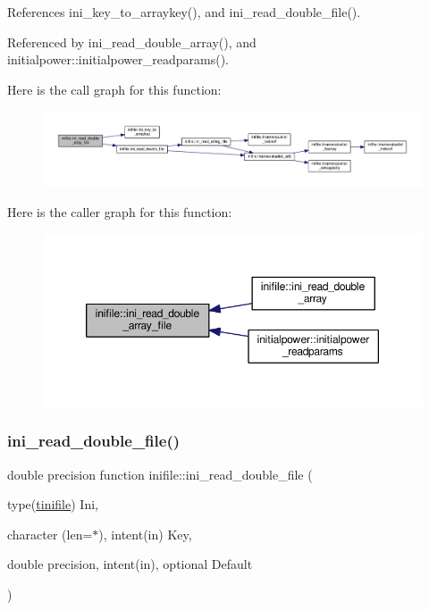 References ini\+\_\+key\+\_\+to\+\_\+arraykey(), and ini\+\_\+read\+\_\+double\+\_\+file().



Referenced by ini\+\_\+read\+\_\+double\+\_\+array(), and initialpower\+::initialpower\+\_\+readparams().

Here is the call graph for this function\+:
\nopagebreak
\begin{figure}[H]
\begin{center}
\leavevmode
\includegraphics[width=350pt]{namespaceinifile_a0b015fcd4b5106643a5da8209d5d03d2_cgraph}
\end{center}
\end{figure}
Here is the caller graph for this function\+:
\nopagebreak
\begin{figure}[H]
\begin{center}
\leavevmode
\includegraphics[width=350pt]{namespaceinifile_a0b015fcd4b5106643a5da8209d5d03d2_icgraph}
\end{center}
\end{figure}
\mbox{\label{namespaceinifile_aa190adb34f30ac9ceb261db1bff4e736}} 
\subsubsection{\texorpdfstring{ini\+\_\+read\+\_\+double\+\_\+file()}{ini\_read\_double\_file()}}
{\footnotesize\ttfamily double precision function inifile\+::ini\+\_\+read\+\_\+double\+\_\+file (\begin{DoxyParamCaption}\item[{type(\mbox{\hyperlink{structinifile_1_1tinifile}{tinifile}})}]{Ini,  }\item[{character (len=$\ast$), intent(in)}]{Key,  }\item[{double precision, intent(in), optional}]{Default }\end{DoxyParamCaption})}



